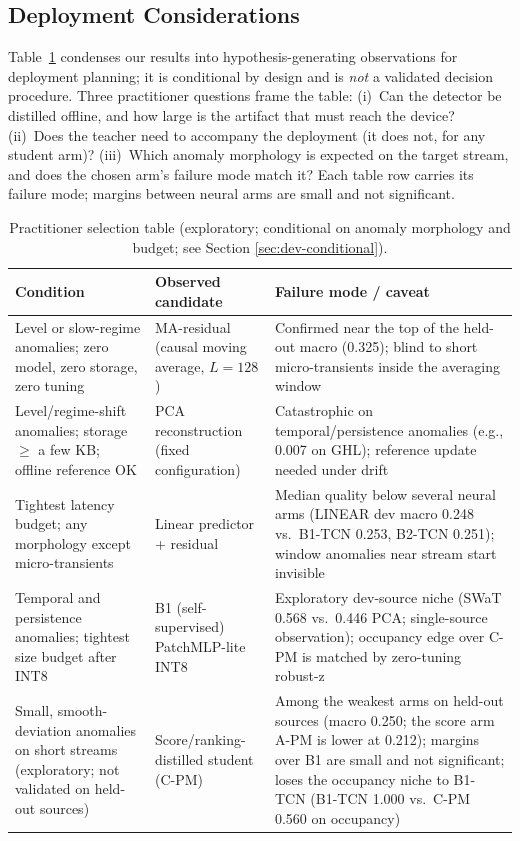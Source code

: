 \documentclass[pdflatex,sn-basic,Numbered]{sn-jnl}
\begin{document}
\subsection{Deployment Considerations}
Table~\ref{tab:selection} condenses our results into
hypothesis-generating observations for deployment planning; it is
conditional by design and is \emph{not} a validated decision
procedure. Three practitioner questions frame the table: (i)~Can the
detector be distilled offline, and how large is the artifact that
must reach the device? (ii)~Does the teacher need to accompany the
deployment (it does not, for any student arm)? (iii)~Which anomaly
morphology is expected on the target stream, and does the chosen
arm's failure mode match it? Each table row carries its failure
mode; margins between neural arms are small and not significant.

\begin{table}[t]
\centering
\caption{Practitioner selection table (exploratory; conditional on anomaly morphology and budget; see Section \ref{sec:dev-conditional}).}
\label{tab:selection}
\scriptsize
\begin{tabular}{p{2.7cm}p{3.4cm}p{3.4cm}}
\toprule
Condition & Observed candidate & Failure mode / caveat \\
\midrule
Level or slow-regime anomalies; zero model, zero storage, zero tuning &
MA-residual (causal moving average, $L{=}128$) & Confirmed near the top of the held-out macro (0.325); blind to short micro-transients inside the averaging window \\
Level/regime-shift anomalies; storage $\ge$ a few KB; offline reference OK &
PCA reconstruction (fixed configuration) & Catastrophic on temporal/persistence anomalies (e.g., 0.007 on GHL); reference update needed under drift \\
Tightest latency budget; any morphology except micro-transients &
Linear predictor + residual & Median quality below several neural arms (LINEAR dev macro 0.248 vs.\ B1-TCN 0.253, B2-TCN 0.251); window anomalies near stream start invisible \\
Temporal and persistence anomalies; tightest size budget after INT8 &
B1 (self-supervised) PatchMLP-lite INT8 & Exploratory dev-source niche (SWaT 0.568 vs.\ 0.446 PCA; single-source observation); occupancy edge over C-PM is matched by zero-tuning robust-z \\
Small, smooth-deviation anomalies on short streams (exploratory; not validated on held-out sources) &
Score/ranking-distilled student (C-PM) & Among the weakest arms on held-out sources (macro 0.250; the score arm A-PM is lower at 0.212); margins over B1 are small and not significant; loses the occupancy niche to B1-TCN (B1-TCN 1.000 vs.\ C-PM 0.560 on occupancy) \\
\bottomrule
\end{tabular}
\end{table}
\end{document}
